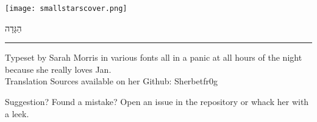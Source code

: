 \documentclass[a5paper,10pt]{memoir}
\begin{document}
\texttt{[image: smallstarscover.png]}

\vspace*{-100ex}  %
\begin{center}
	\noindent \HUGE \color{cyan} \texthebrew{הַגָּדָה} \centering
	\vfill
\end{center}
\vspace*{80ex}  %
%
\onecolumn

{\color{cyan} \rule{\linewidth}{0.5mm}}

\vfill
%
Typeset by Sarah Morris in various fonts all in a panic at all hours of the night because she really loves Jan.  \\
Translation Sources available on her Github: Sherbetfr0g

% 
Suggestion? Found a mistake? Open an issue in the repository or whack her with a leek.
% 

\onecolumn
%
\end{document}
